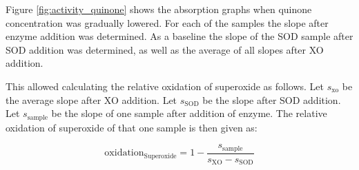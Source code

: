 Figure \ref{fig:activity_quinone} shows the absorption graphs when quinone
concentration was gradually lowered. For each of the samples the slope after
enzyme addition was determined. As a baseline the slope of the SOD sample after
SOD addition was determined, as well as the average of all slopes after XO
addition.

This allowed calculating the relative oxidation of superoxide as follows. Let
$s_{\text{xo}}$ be the average slope after XO addition. Let $s_{\text{SOD}}$ be
the slope after SOD addition. Let $s_{\text{sample}}$ be the slope of one
sample after addition of enzyme. The relative oxidation of superoxide of that
one sample is then given as:

\[
	\text{oxidation}_{\text{Superoxide}} = 1 - \frac{s_{\text{sample}}}{s_{\text{XO}} - s_{\text{SOD}}}
\]



